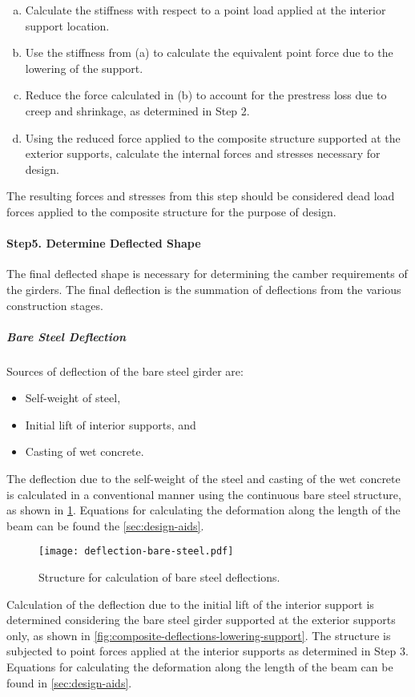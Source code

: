 \begin{enumerate}[a)]
  \item Calculate the stiffness with respect to a point load applied at the interior support location.
  \item Use the stiffness from (a) to calculate the equivalent point force due to the lowering of the support.
  \item Reduce the force calculated in (b) to account for the prestress loss due to creep and shrinkage, as
  determined in Step 2.
  \item Using the reduced force applied to the composite structure supported at the exterior supports, calculate
  the internal forces and stresses necessary for design.
\end{enumerate}

The resulting forces and stresses from this step should be considered dead load forces applied to the composite
structure for the purpose of design.

\paragraph*{Step5. Determine Deflected Shape}
The final deflected shape is necessary for determining the camber requirements of the girders. The final deflection is the summation of deflections from the various construction stages.

\subparagraph*{Bare Steel Deflection}
Sources of deflection of the bare steel girder are:
\begin{itemize}
  \item Self-weight of steel,
  \item Initial lift of interior supports, and
  \item Casting of wet concrete.
\end{itemize}

The deflection due to the self-weight of the steel and casting of the wet concrete is calculated in a conventional manner using the continuous bare steel structure, as shown in \cref{fig:deflection-bare-steel}. Equations for calculating the deformation along the length of the beam can be found the \cref{sec:design-aids}.

\begin{figure}
  \texttt{[image: deflection-bare-steel.pdf]}
  \caption{Structure for calculation of bare steel deflections.}
  \label{fig:deflection-bare-steel}
\end{figure}

Calculation of the deflection due to the initial lift of the interior support is determined considering the bare steel
girder supported at the exterior supports only, as shown in \cref{fig:composite-deflections-lowering-support}. The structure is subjected to point forces
applied at the interior supports as determined in Step 3. Equations for calculating the deformation along the length
of the beam can be found in \cref{sec:design-aids}.

